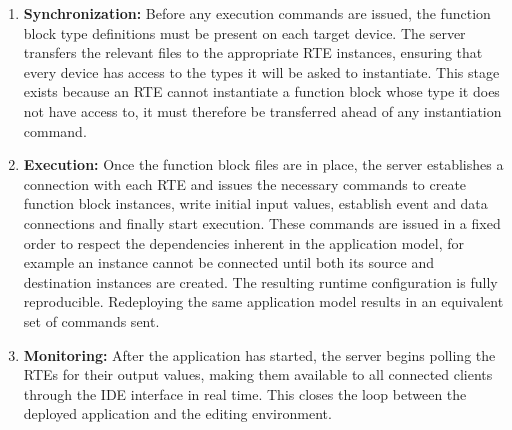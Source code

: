 \begin{enumerate}
    \item \textbf{Synchronization:} Before any execution commands are issued, the function block type definitions must be present on each target device. The server transfers the relevant files to the appropriate \ac{RTE} instances, ensuring that every device has access to the types it will be asked to instantiate. This stage exists because an \ac{RTE} cannot instantiate a function block whose type it does not have access to, it must therefore be transferred ahead of any instantiation command.

    \item \textbf{Execution:} Once the function block files are in place, the server establishes a connection with each \ac{RTE} and issues the necessary commands to create function block instances, write initial input values, establish event and data connections and finally start execution. These commands are issued in a fixed order to respect the dependencies inherent in the application model, for example an instance cannot be connected until both its source and destination instances are created. The resulting runtime configuration is fully reproducible. Redeploying the same application model results in an equivalent set of commands sent.

    \item \textbf{Monitoring:} After the application has started, the server begins polling the \acp{RTE} for their output values, making them available to all connected clients through the \ac{IDE} interface in real time. This closes the loop between the deployed application and the editing environment.
\end{enumerate}
